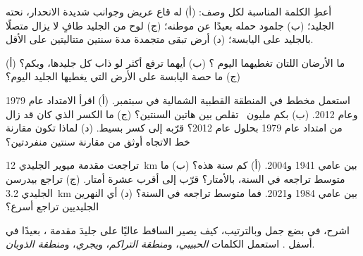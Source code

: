 \begin{exercise}[$\star$]\label{exo:g8:ice-on-earth:3}
أعطِ الكلمة المناسبة لكل وصف: (أ)  له قاع عريض وجوانب شديدة الانحدار،
نحته الجليد؛ (ب) جلمود حمله  بعيدًا عن موطنه؛ (ج) لوح من الجليد طافٍ
لا يزال متصلًا بالجليد على اليابسة؛ (د) أرض تبقى متجمدة مدة سنتين متتاليتين على
الأقل.
\end{exercise}

\begin{exercise}[$\star$]\label{exo:g8:ice-on-earth:4}
(أ) ما الأرضان اللتان تغطيهما اليوم ؟ (ب) أيهما ترفع  أكثر لو
ذاب كل جليدها، وبكم؟ (ج) ما حصة اليابسة على الأرض التي يغطيها الجليد
اليوم؟
\end{exercise}

\begin{exercise}[$\star\star$]\label{exo:g8:ice-on-earth:5}
استعمل مخطط  في المنطقة القطبية الشمالية في سبتمبر. (أ) اقرأ
الامتداد عام 1979 وعام 2012. (ب) بكم مليون~ تقلص بين هاتين
السنتين؟ (ج) ما الكسر الذي كان قد زال من امتداد عام 1979 بحلول عام 2012؟
قرّبه إلى كسر بسيط. (د) لماذا تكون مقارنة خط الاتجاه أوثق من مقارنة سنتين
منفردتين؟
\end{exercise}

\begin{exercise}[$\star\star$]\label{exo:g8:ice-on-earth:6}
تراجعت مقدمة  ميوير الجليدي \qty{12}{km} بين عامي 1941 و2004.
(أ) كم سنة هذه؟ (ب) ما متوسط تراجعه في السنة، بالأمتار؟ قرّب إلى أقرب عشرة
أمتار. (ج) تراجع  بيدرسن الجليدي \qty{3.2}{km} بين عامي 1984 و2021. فما
متوسط تراجعه في السنة؟ (د) أي النهرين الجليديين تراجع
أسرع؟
\end{exercise}

\begin{exercise}[$\star\star$]\label{exo:g8:ice-on-earth:7}
اشرح، في بضع جمل وبالترتيب، كيف يصير  الساقط عاليًا على  جليدَ مقدمة
، بعيدًا في أسفل . استعمل الكلمات \emph{ الحبيبي}،
و\emph{منطقة التراكم}، و\emph{يجري}، و\emph{منطقة
الذوبان}.
\end{exercise}

